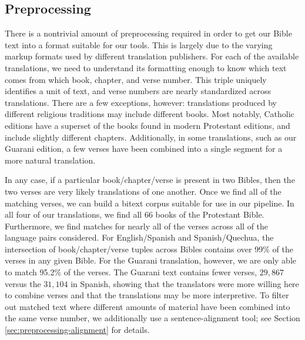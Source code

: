 \subsection{Preprocessing}
There is a nontrivial amount of preprocessing required in order to get our
Bible text into a format suitable for our tools.  This is largely due to the
varying markup formats used by different translation publishers.
For each of the available translations, we need to understand its formatting
enough to know which text comes from which book, chapter, and verse number.
This triple uniquely identifies a unit of text, and verse numbers are nearly
standardized across translations.  There are a few exceptions, however:
translations produced by different religious traditions may include different
books. Most notably, Catholic editions have a superset of the books found in
modern Protestant editions, and include slightly different chapters.
Additionally, in some translations, such as our Guarani edition, a few verses
have been combined into a single segment for a more natural translation.

In any case, if a particular book/chapter/verse is present in two Bibles, then
the two verses are very likely translations of one another. Once we find all of
the matching verses, we can build a bitext corpus suitable for use in our
pipeline.  In all four of our translations, we find all 66 books of the
Protestant Bible. Furthermore, we find matches for nearly all of the verses
across all of the language pairs considered. For English/Spanish and
Spanish/Quechua, the intersection of book/chapter/verse tuples across Bibles
contains over 99\% of the verses in any given Bible. For the Guarani
translation, however, we are only able to match 95.2\% of the verses. The
Guarani text contains fewer verses, $29,867$ versus the $31,104$ in Spanish,
showing that the translators were more willing here to combine verses and that
the translations may be more interpretive. To filter out matched text where
different amounts of material have been combined into the same verse number, we
additionally use a sentence-alignment tool; see Section
\ref{sec:preprocessing-alignment} for details.


